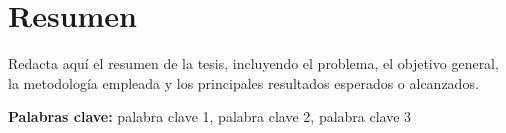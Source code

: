 \chapter*{Resumen}

Redacta aquí el resumen de la tesis, incluyendo el problema, el objetivo general, la metodología empleada y los principales resultados esperados o alcanzados.

\noindent\textbf{Palabras clave:} palabra clave 1, palabra clave 2, palabra clave 3
